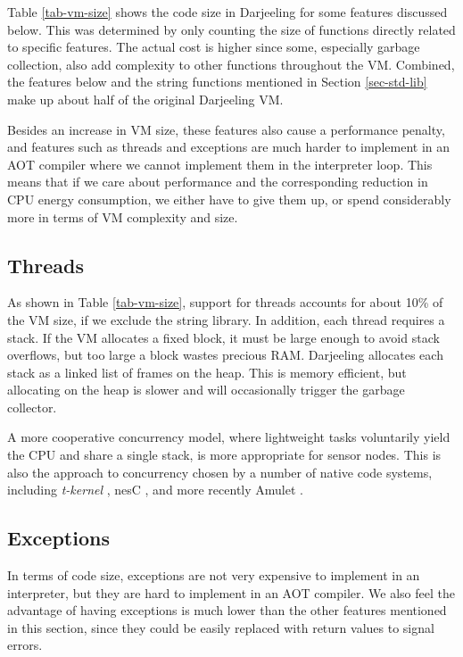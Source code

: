Table \ref{tab-vm-size} shows the code size in Darjeeling for some features discussed below. This was determined by only counting the size of functions directly related to specific features. The actual cost is higher since some, especially garbage collection, also add complexity to other functions throughout the VM. Combined, the features below and the string functions mentioned in Section \ref{sec-std-lib} make up about half of the original Darjeeling VM.

Besides an increase in VM size, these features also cause a performance penalty, and features such as threads and exceptions are much harder to implement in an AOT compiler where we cannot implement them in the interpreter loop. This means that if we care about performance and the corresponding reduction in CPU energy consumption, we either have to give them up, or spend considerably more in terms of VM complexity and size.


\subsection{Threads}
As shown in Table \ref{tab-vm-size}, support for threads accounts for about 10\% of the VM size, if we exclude the string library. In addition, each thread requires a stack. If the VM allocates a fixed block, it must be large enough to avoid stack overflows, but too large a block wastes precious RAM. Darjeeling allocates each stack as a linked list of frames on the heap. This is memory efficient, but allocating on the heap is slower and will occasionally trigger the garbage collector.

A more cooperative concurrency model, where lightweight tasks voluntarily yield the CPU and share a single stack, is more appropriate for sensor nodes. This is also the approach to concurrency chosen by a number of native code systems, including \emph{t-kernel} \cite{Gu:2005un}, nesC \cite{Gay:2003up}, and more recently Amulet \cite{Hester:2016je}.


\subsection{Exceptions}
In terms of code size, exceptions are not very expensive to implement in an interpreter, but they are hard to implement in an AOT compiler. We also feel the advantage of having exceptions is much lower than the other features mentioned in this section, since they could be easily replaced with return values to signal errors.


